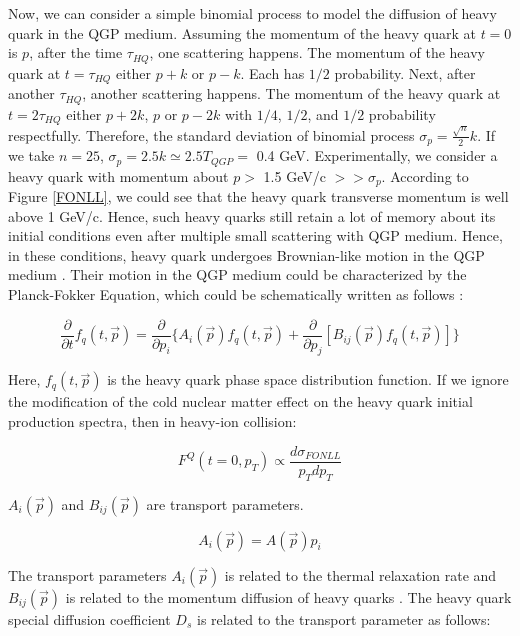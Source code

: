 Now, we can consider a simple binomial process to model the diffusion of heavy quark in the QGP medium. Assuming the momentum of the heavy quark at $t = 0$ is $p$, after the time $\tau_{HQ}$, one scattering happens. The momentum of the heavy quark at $t = \tau_{HQ}$ either $p + k$ or $p - k$. Each has $1/2$ probability. Next, after another $\tau_{HQ}$, another scattering happens. The momentum of the heavy quark at $t = 2\tau_{HQ}$ either $p + 2k$, $p$ or $p - 2k$ with $1/4$, $1/2$, and $1/2$ probability respectfully. Therefore, the standard deviation of binomial process $\sigma_p = \frac{\sqrt{n}}{2} k$. If we take $n = 25$, $\sigma_p = 2.5k \simeq 2.5 T_{QGP} =$ 0.4 GeV. Experimentally, we consider a heavy quark with momentum about $p  > $ 1.5 GeV/c $>> \sigma_p$. According to Figure \ref{FONLL}, we could see that the heavy quark transverse momentum is well above 1 GeV/c. Hence, such heavy quarks still retain a lot of memory about its initial conditions even after multiple small scattering with QGP medium. Hence, in these conditions, heavy quark undergoes Brownian-like motion in the QGP medium \cite{HQReview}. Their motion in the QGP medium could be characterized by the Planck-Fokker Equation, which could be schematically written as follows \cite{HQRaff}:

\begin{equation}
\frac{\partial}{\partial t} f_q(t, \vec{p}) = \frac{\partial}{\partial p_{i}} \{ A_i(\vec p) f_q(t,\vec{p}) + \frac{\partial}{\partial p_j}[B_{ij}(\vec{p})f_q(t,\vec{p}) ] \}
\end{equation}

Here, $f_q(t,\vec{p})$ is the heavy quark phase space distribution function. If we ignore the modification of the cold nuclear matter effect on the heavy quark initial production spectra, then in heavy-ion collision:

\begin{equation}
F^Q( t = 0,p_T) \propto \frac{d\sigma_{FONLL}}{p_Tdp_T}
\end{equation}

$A_i(\vec p)$ and $B_{ij}(\vec p)$ are transport parameters. 

\begin{equation}
A_i(\vec p) = A(\vec p) p_i
\end{equation}


The transport parameters $A_i(\vec{p})$ is related to the thermal relaxation rate and $B_{ij}(\vec{p})$ is related to the momentum diffusion of heavy quarks \cite{HQReview}. The heavy quark special diffusion coefficient $D_s$ is related to the transport parameter as follows:

